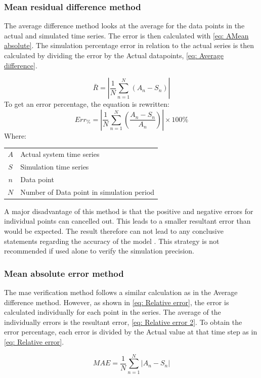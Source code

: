  		\subsubsection{Mean residual difference method}
 			The average difference method looks at the average for the data points in the actual and simulated time series.  The error is then calculated with \cref{eq: AMean absolute}. The simulation percentage error in relation to the actual series is then calculated by dividing the error by the Actual datapoints, \cref{eq: Average difference}.
 			
 			\begin{equation}
 			\label{eq: AMean absolute}
 			\bar{R} = \left| \dfrac{1}{N} \sum_{n=1}^{N}{ \left( A_{n} - S_{n}\right)}  \right|
 			\end{equation}
 To get	an error percentage, the equation is rewritten:	
 			\begin{equation}
 				\label{eq: Average difference}
 				Err_{\%} = \left| \dfrac{1}{N} \sum_{n=1}^{N}{ \left(\dfrac{ A_{n} - S_{n}}{A_n}\right)}  \right| \times 100 \%
 			\end{equation}
 			Where: \par 
 				\begin{table}[h!]
 					\centering
 					\begin{tabular}{cl}
 						$A$ & Actual system time series \\
 						$S$ & Simulation time series \\
 						$n$ & Data point \\
 						$N$ & Number of Data point in simulation period \\
 					\end{tabular} 
 				\end{table}	
 			A major disadvantage of this method is that the positive and negative errors for individual points can cancelled out. This leads to a smaller resultant error than would be expected. The result therefore can not lead to any conclusive statements regarding the accuracy of the model \cite{sarin2010comparing}.  This strategy is not recommended if used alone to verify the simulation precision.
 			
 			
 		\subsubsection{Mean absolute error method}
 		The \gls{mae} verification method follows a similar calculation as in the Average difference method. However, as shown in \cref{eq: Relative error}, the error is calculated individually for each point in the series. The average of the individually errors is the resultant error, \cref{eq: Relative error 2}. To obtain the error percentage, each error is divided by the Actual value at that time step as in \cref{eq: Relative error}.
 		\par
 		\begin{equation}
 		\label{eq: Relative error 2}
 		MAE = \dfrac{1}{N}\sum_{n=1}^{N}{\left|A_{n} - S_{n}\right| }
 		\end{equation}
 		

